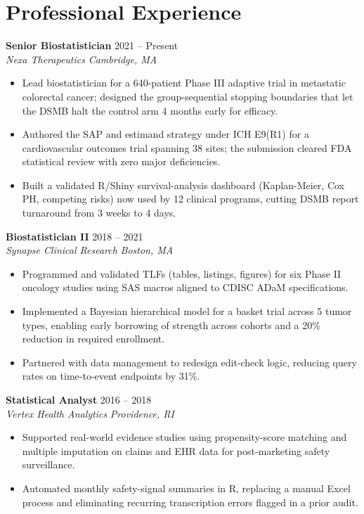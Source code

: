 \documentclass[9.5pt,letterpaper]{article}
\newcommand{\role}[4]{%
  \textbf{#1} \hfill {\small\color{slategray} #2}\\
  {\itshape\color{signalteal} #3} \hfill {\small\itshape\color{slategray} #4}\\[0pt]
}
\begin{document}
\section*{Professional Experience}

\role{Senior Biostatistician}{2021 -- Present}{Nexa Therapeutics}{Cambridge, MA}
\begin{itemize}
  \item Lead biostatistician for a 640-patient Phase III adaptive trial in metastatic colorectal
        cancer; designed the group-sequential stopping boundaries that let the DSMB halt the
        control arm 4 months early for efficacy.
  \item Authored the SAP and estimand strategy under ICH E9(R1) for a cardiovascular outcomes
        trial spanning 38 sites; the submission cleared FDA statistical review with zero
        major deficiencies.
  \item Built a validated R/Shiny survival-analysis dashboard (Kaplan-Meier, Cox PH, competing
        risks) now used by 12 clinical programs, cutting DSMB report turnaround from 3 weeks to 4 days.
\end{itemize}

\role{Biostatistician II}{2018 -- 2021}{Synapse Clinical Research}{Boston, MA}
\begin{itemize}
  \item Programmed and validated TLFs (tables, listings, figures) for six Phase II oncology
        studies using SAS macros aligned to CDISC ADaM specifications.
  \item Implemented a Bayesian hierarchical model for a basket trial across 5 tumor types,
        enabling early borrowing of strength across cohorts and a 20\% reduction in required
        enrollment.
  \item Partnered with data management to redesign edit-check logic, reducing query rates on
        time-to-event endpoints by 31\%.
\end{itemize}

\role{Statistical Analyst}{2016 -- 2018}{Vertex Health Analytics}{Providence, RI}
\begin{itemize}
  \item Supported real-world evidence studies using propensity-score matching and multiple
        imputation on claims and EHR data for post-marketing safety surveillance.
  \item Automated monthly safety-signal summaries in R, replacing a manual Excel process and
        eliminating recurring transcription errors flagged in a prior audit.
\end{itemize}
\end{document}
